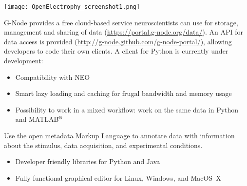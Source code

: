 \begin{multicols}{3}
\vspace{0.5em}
\texttt{[image: OpenElectrophy\_screenshot1.png]}





\vspace{0.5em}

G-Node provides a free cloud-based service neuroscientists can use for
storage, management and sharing of data
(\url{https://portal.g-node.org/data/}). An API for data access is
provided (\url{http://g-node.github.com/g-node-portal/}), allowing
developers to code their own clients.
A client for Python is currently under development: %

\begin{itemize}[nolistsep,topsep=0em,leftmargin=1pc]
\item Compatibility with NEO%
\item Smart lazy loading and caching for frugal bandwidth and memory usage
\item Possibility to work in a mixed workflow: work on the same data in Python and MATLAB$^\textrm{\textregistered}$
\end{itemize}


%


Use the {open metadata Markup Language} to annotate data with information about the stimulus, data acquisition, and experimental conditions.

\begin{itemize}[nolistsep,topsep=0em,leftmargin=1pc]
\item Developer friendly libraries for Python and Java
\item Fully functional graphical editor for Linux, Windows, and MacOS~X
\end{itemize}


\end{multicols}
